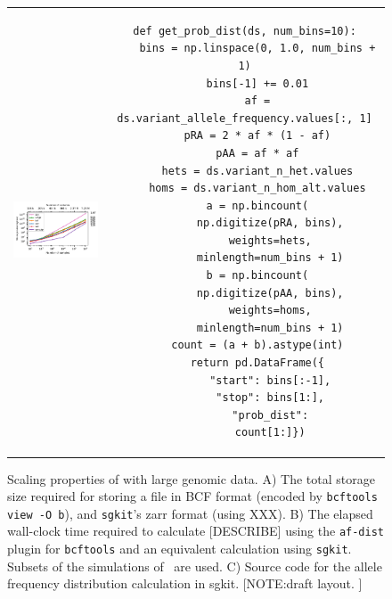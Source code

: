\documentclass[9pt,lineno]{elife}
\begin{document}
\begin{figure}
\begin{tabular}{cc}
\includegraphics[width=6cm]{figures/data-scaling} &
\begin{tcolorbox}[width=7cm]
\begin{verbatim}
def get_prob_dist(ds, num_bins=10):
    bins = np.linspace(0, 1.0, num_bins + 1)
    bins[-1] += 0.01
    af = ds.variant_allele_frequency.values[:, 1]
    pRA = 2 * af * (1 - af)
    pAA = af * af
    hets = ds.variant_n_het.values
    homs = ds.variant_n_hom_alt.values
    a = np.bincount(
        np.digitize(pRA, bins),
        weights=hets,
        minlength=num_bins + 1)
    b = np.bincount(
        np.digitize(pAA, bins),
        weights=homs,
        minlength=num_bins + 1)
    count = (a + b).astype(int)
    return pd.DataFrame({
        "start": bins[:-1],
        "stop": bins[1:],
        "prob_dist":
        count[1:]})
\end{verbatim}
\end{tcolorbox}
\end{tabular}
\caption{Scaling properties of with large genomic data.
A) The total storage size required for storing a file in BCF format
(encoded by \texttt{bcftools view -O b}), and \texttt{sgkit}'s zarr
format (using XXX).
B) The elapsed wall-clock time required to calculate [DESCRIBE]
using the \texttt{af-dist} plugin for \texttt{bcftools} and
an equivalent calculation using \texttt{sgkit}.
Subsets of the simulations of~\citep{anderson2023genes} are used.
C) Source code for the allele frequency distribution calculation
in sgkit.
[NOTE:draft layout. ]
\label{fig:data_scaling}}
\end{figure}
\end{document}
